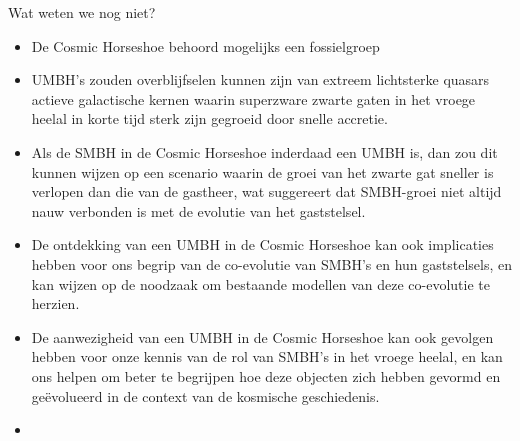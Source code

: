 \documentclass[aspectratio=169,xcolor=dvipsnames]{beamer}
\begin{document}
\begin{frame}{Wat weten we nog niet?}
    \begin{itemize}
        \item De Cosmic Horseshoe behoord mogelijks een fossielgroep
        \item UMBH's zouden overblijfselen kunnen zijn van extreem lichtsterke quasars actieve galactische kernen waarin superzware zwarte gaten in het vroege heelal in korte tijd sterk zijn gegroeid door snelle accretie.
        \item Als de SMBH in de Cosmic Horseshoe inderdaad een UMBH is, dan zou dit kunnen wijzen op een scenario waarin de groei van het zwarte gat sneller is verlopen dan die van de gastheer, wat suggereert dat SMBH-groei niet altijd nauw verbonden is met de evolutie van het gaststelsel.
        \item De ontdekking van een UMBH in de Cosmic Horseshoe kan ook implicaties hebben voor ons begrip van de co-evolutie van SMBH's en hun gaststelsels, en kan wijzen op de noodzaak om bestaande modellen van deze co-evolutie te herzien.
        \item De aanwezigheid van een UMBH in de Cosmic Horseshoe kan ook gevolgen hebben voor onze kennis van de rol van SMBH's in het vroege heelal, en kan ons helpen om beter te begrijpen hoe deze objecten zich hebben gevormd en geëvolueerd in de context van de kosmische geschiedenis.
        \item 

    \end{itemize}
\end{frame}
\end{document}
